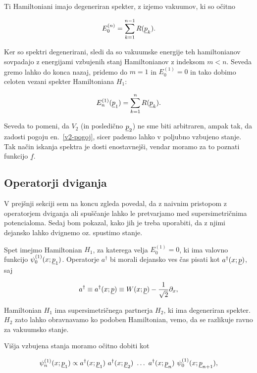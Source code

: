 Ti Hamiltoniani imajo degeneriran spekter, z izjemo vakuumov, ki so o\v citno

\begin{equation}
	E^{(n)}_0 = \sum_{k = 1}^{n - 1} R(\underline{p}_k).
\end{equation}

Ker so spektri degenerirani, sledi da so vakuumske energije teh hamiltonianov sovpadajo z energijami vzbujenih
stanj Hamiltonianov z indeksom $m < n$. Seveda gremo lahko do konca nazaj, pridemo do $m = 1$ in $E^{(1)}_0 = 0$
in tako dobimo celoten vezani spekter Hamiltoniana $H_1$:

\begin{equation}
	E_n^{(1)} (\underline{p}_1) = \sum_{k = 1}^n R (\underline{p}_k).
	\label{v2-pogoj}
\end{equation}

Seveda to pomeni, da $V_2$ (in posledi\v cno $\underline{p}_2$) ne sme biti arbitraren, ampak tak, da zadosti pogoju
en.~\eqref{v2-pogoj}, sicer pademo lahko v poljubno vzbujeno stanje. Tak na\v cin iskanja spektra je dosti
enostavnej\v si, vendar moramo za to poznati funkcijo $\underline{f}$. 

\subsection{Operatorji dviganja}

V prej\v snji sekciji sem na koncu zgleda povedal, da z naivnim pristopom z operatorjem dviganja ali
spu\v s\v canje lahko le pretvarjamo med supersimetri\v cnima potencialoma. Sedaj bom pokazal, kako jih
je treba uporabiti, da z njimi dejansko lahko dvignemo oz. spustimo stanje.

Spet imejmo Hamiltonian $H_1$, za katerega velja $E^{(1)}_0 = 0$, ki ima valovno funkcijo
$\psi_0^{(1)} (x; \underline{p}_1)$. Operatorje $a^\dagger$ bi morali dejansko ves \v cas pisati kot $a^\dagger (x; \underline{p})$,
saj

\[
	a^\dagger \equiv a^\dagger (x; \underline{p}) \equiv W(x; \underline{p}) - \frac{1}{\sqrt{2}}\partial_x,
\]

Hamiltonian $H_1$ ima supersimetri\v cnega partnerja $H_2$, ki ima degeneriran spekter. $H_2$ zato lahko
obravnavamo ko podoben Hamiltonian, vemo, da se razlikuje ravno za vakuumsko stanje.

Vi\v sja vzbujena stanja moramo o\v citno dobiti kot

\begin{equation}
	\psi^{(1)}_n (x; \underline{p}_1) \propto a^\dagger (x;\underline{p}_1)\ a^\dagger (x;\underline{p}_2)\ \ldots\ a^\dagger (x; \underline{p}_n)\
		\psi^{(1)}_0 (x; \underline{p}_{n+1}),
\end{equation}

